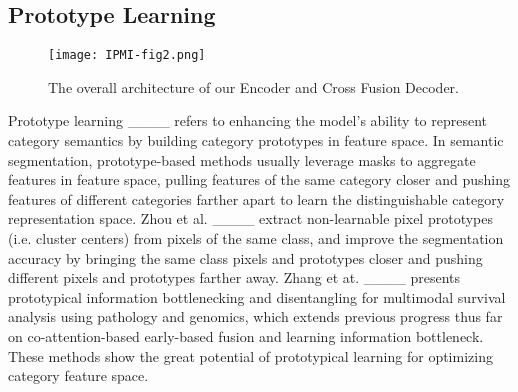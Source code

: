 \subsection{Prototype Learning}
\begin{figure*}[th]
\texttt{[image: IPMI-fig2.png]}
\caption{The overall architecture of our Encoder and Cross Fusion Decoder.} 
\label{fig.2}
\end{figure*}
Prototype learning ____ refers to enhancing the model's ability to represent category semantics by building category prototypes in feature space. In semantic segmentation, prototype-based methods usually leverage masks to aggregate features in feature space, pulling features of the same category closer and pushing features of different categories farther apart to learn the distinguishable category representation space.
Zhou et al. ____ extract non-learnable pixel prototypes (i.e. cluster centers) from pixels of the same class, and improve the segmentation accuracy by bringing the same class pixels and prototypes closer and pushing different pixels and prototypes farther away. Zhang et at. ____ presents prototypical information bottlenecking and disentangling for multimodal survival analysis using pathology and genomics, which extends previous progress thus far on co-attention-based early-based fusion and learning information bottleneck. These methods show the great potential of prototypical learning for optimizing category feature space.